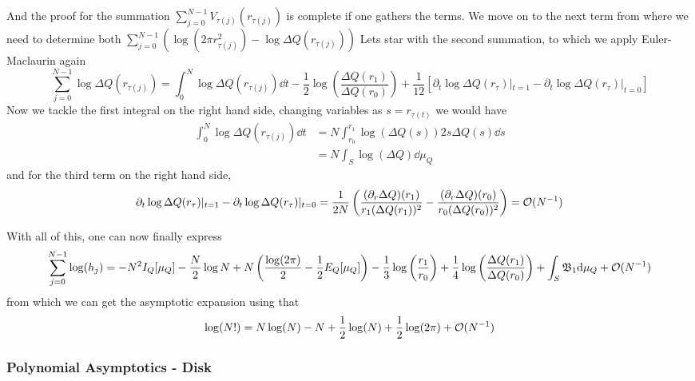 And the proof for the summation $\sum_{j=0}^{N-1} V_{\tau(j)}(r_{\tau(j)})$ is complete if one gathers the terms. We move on to the next term from where we need to determine both $ \sum_{j=0}^{N-1}\left(\log(2\pi r^2_{\tau(j)}) - \log \Delta Q(r_{\tau(j)}) \right)$ Lets star with the second summation, to which we apply Euler-Maclaurin again
\begin{equation}
	\sum_{j=0}^{N-1}  \log \Delta Q(r_{\tau(j)}) = \int_{0}^{N} \log \Delta Q(r_{\tau(j)}) \dd t - \frac{1}{2} \log \left( \frac{\Delta Q(r_1)}{\Delta Q(r_0)} \right) + \frac{1}{12} \left[ \partial_t \log \Delta Q (r_\tau) |_{t=1} - \partial_t \log \Delta Q(r_\tau) |_{t=0}\right]
\end{equation}
Now we tackle the first integral on the right hand side, changing variables as $s = r_{\tau(t)}$ we would have
\begin{align}
	\int_{0}^{N} \log \Delta Q(r_{\tau(j)}) \dd t & = N \int_{r_0}^{r_1} \log(\Delta Q(s)) 2 s \Delta Q(s) \dd s \\
	& = N \int_{S} \log(\Delta Q) \dd \mu_Q
\end{align}
and for the third term on the right hand side, 
\begin{equation}
	\partial_t \log \Delta Q (r_\tau) |_{t=1} - \partial_t \log \Delta Q(r_\tau) |_{t=0} = \frac{1}{2N} \left( \frac{(\partial_r \Delta Q)(r_1)}{r_1 (\Delta Q(r_1))^2} - \frac{(\partial_r \Delta Q)(r_0)}{r_0 (\Delta Q(r_0))^2}\right) = \mathcal{O}(N^{-1})
\end{equation}

With all of this, one can now finally express
\begin{equation}
	\sum_{j=0}^{N-1} \log(h_j) = - N^2 I_Q[\mu_Q] - \frac{N}{2} \log N + N \left(\frac{\log(2\pi)}{2} - \frac{1}{2} E_Q[\mu_Q]\right) - \frac{1}{3} \log\left(\frac{r_1}{r_0} \right) + \frac{1}{4} \log\left(\frac{\Delta Q(r_1)}{\Delta Q(r_0)} \right) + \int_S \mathfrak{B}_1 \mathrm{d} \mu_Q + \mathcal{O}(N^{-1})
\end{equation}
from which we can get the asymptotic expansion using that
\begin{equation}
	\log(N!) = N\log(N) - N + \frac{1}{2} \log(N) + \frac{1}{2} \log(2 \pi) + \mathcal{O}(N^{-1})
\end{equation}

\subsubsection{Polynomial Asymptotics - Disk}

